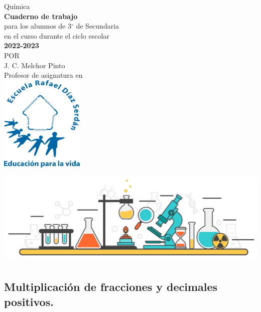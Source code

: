 \documentclass[11pt]{book}
\begin{document}
\pagestyle{empty}
\begin{center}
  {\Huge Qu\'imica}\\
  \vspace{2cm}
  \normalsize
  \textbf{\large Cuaderno de trabajo}\\
  para los alumnos de 3$^\circ$ de  Secundaria\\
  en el curso durante el ciclo escolar\\
  \textbf{2022-2023}\\
  \vspace{2cm}
  \small POR\\
  \Large J. C. Melchor Pinto\\[0.5em]
  \normalsize Profesor de asignatura en\\
  \vspace{1cm}
  \includegraphics[width=4cm]{./Unidad 2/Images/LOGO_RDS_nobg}
\end{center}
\vspace{1cm}
%
\hspace{-16mm}
\includegraphics[width=\paperwidth]{./Unidad 2/Images/cover_bg}
\restoregeometry
\tableofcontents
\chapter{}

\section{Multiplicación de fracciones y decimales positivos.}
\end{document}
